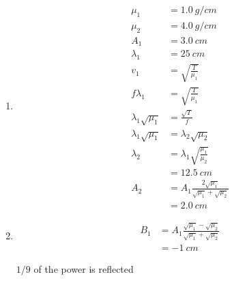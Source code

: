 \documentclass{article}
\begin{document}
\begin{enumerate}
  \item

        \begin{align*}
          \mu_1                  & = \qty{1.0}{g/cm}                                        \\
          \mu_2                  & = \qty{4.0}{g/cm}                                        \\
          A_1                    & = \qty{3.0}{cm}                                          \\
          \lambda_1              & = \qty{25}{cm}                                           \\
          v_1                    & = \sqrt{\frac{T}{\mu_1}}                                 \\
          f \lambda_1            & = \sqrt{\frac{T}{\mu_1}}                                 \\
          \lambda_1 \sqrt{\mu_1} & = \frac{\sqrt{T}}{f}                                     \\
          \lambda_1 \sqrt{\mu_1} & = \lambda_2 \sqrt{\mu_2}                                 \\
          \lambda_2              & = \lambda_1 \sqrt{\frac{\mu_1}{\mu_2}}                   \\
                                 & = \qty{12.5}{cm}                                         \\
          A_2                    & = A_1 \frac{2 \sqrt{\mu_1}}{\sqrt{\mu_1} + \sqrt{\mu_2}} \\
                                 & = \qty{2.0}{cm}
        \end{align*}

  \item

        \begin{align*}
          B_1 & = A_1 \frac{\sqrt{\mu_1} - \sqrt{\mu_2}}{\sqrt{\mu_1} + \sqrt{\mu_2}} \\
              & = \qty{-1}{cm}
        \end{align*}

        $1 / 9$ of the power is reflected
\end{enumerate}

\subsection{}
\end{document}
